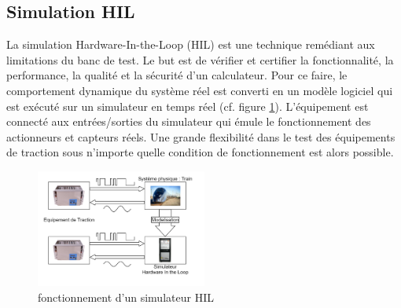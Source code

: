 \documentclass[a4paper]{report}
\begin{document}
\subsection{Simulation HIL}	
	La simulation Hardware-In-the-Loop (HIL) est une technique remédiant aux limitations du banc de test. Le but est de vérifier et certifier la fonctionnalité, la performance, la qualité et la sécurité d'un calculateur. Pour ce faire, le comportement dynamique du système réel est converti en un modèle logiciel qui est exécuté sur un simulateur en temps réel (cf. figure \ref{schema:hil}).
	L'équipement est connecté aux entrées/sorties du simulateur qui émule le fonctionnement des actionneurs et capteurs réels. 
	 Une grande flexibilité dans le test des équipements de traction sous n'importe quelle condition de fonctionnement est alors possible.

	\begin{figure}
		\includegraphics[width=0.5\textwidth]{schema_hil}
		\caption{fonctionnement d'un simulateur HIL}
		\label{schema:hil}
	\end{figure}
	
\end{document}
